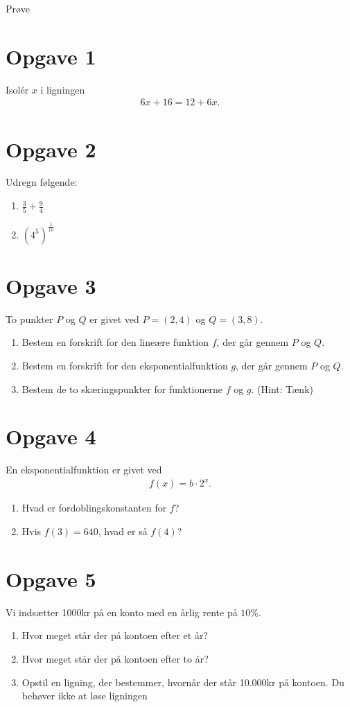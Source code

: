 
\begin{center}
\Huge
Prøve 
\end{center}

\section*{Opgave 1}
Isolér $x$ i ligningen 
\begin{align*}
6x+16 = 12+6x.
\end{align*}
\section*{Opgave 2}
Udregn følgende:
\begin{enumerate}[label=\roman*)]
\item $\frac{3}{5} + \frac{9}{4} $
\item $(4^{5})^{\frac{1}{10}}$
\end{enumerate}

\section*{Opgave 3}
To punkter $P$ og $Q$ er givet ved $P = (2,4)$ og $Q = (3,8)$.
\begin{enumerate}[label=\roman*)]
\item Bestem en forskrift for den lineære funktion $f$, der går gennem $P$ og $Q$.
\item Bestem en forskrift for den eksponentialfunktion $g$, der går gennem $P$ og $Q$. 
\item Bestem de to skæringspunkter for funktionerne $f$ og $g$. (Hint: Tænk)
\end{enumerate} 

\section*{Opgave 4}
En eksponentialfunktion er givet ved 
\begin{align*}
f(x) = b\cdot 2^x.
\end{align*}
\begin{enumerate}[label=\roman*)]
\item Hvad er fordoblingskonstanten for $f$?
\item Hvis $f(3) = 640$, hvad er så $f(4)$?
\end{enumerate}

\section*{Opgave 5}
Vi indsætter 1000kr på en konto med en årlig rente på $10\%$.
\begin{enumerate}[label=roman*)]
\item Hvor meget står der på kontoen efter et år? 
\item Hvor meget står der på kontoen efter to år?
\item Opstil en ligning, der bestemmer, hvornår der står 10.000kr på kontoen. Du behøver ikke at løse ligningen
\end{enumerate} 